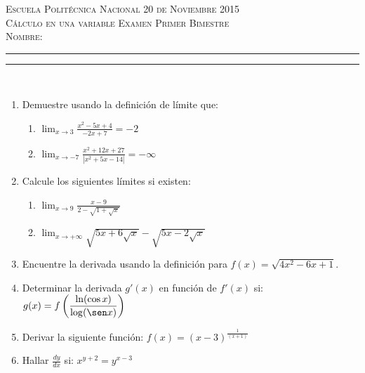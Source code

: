 \documentclass[11pt,a4paper,oneside]{article}\usepackage[]{graphicx}\usepackage[]{color}
\begin{document}
\thispagestyle{empty}
{\sf
{\Large \scshape Escuela Polit\'{e}cnica Nacional} \hfill {\scshape 20 de Noviembre 2015}\\[3mm] 
{\scshape C\'{a}lculo en una variable \hfill Examen Primer Bimestre}\\[7mm]
{\scshape Nombre:} \rule{0.6\textwidth}{0.5pt} \rule{0.1\textwidth}{0.5pt}\\
}













\begin{enumerate}
      \item Demuestre usando la definici\'{o}n de l\'{i}mite que:
      \begin{enumerate}
            \item $\displaystyle \lim_{x \to 3} \displaystyle \frac{x^2-5x+4}{-2x+7}=-2$\\[100mm]
            \item $\displaystyle \lim_{x \to -7} \displaystyle \frac{x^2+12x+27}{|x^2+5x-14|}=-\infty$\\[70mm]
      \end{enumerate}
      \newpage
      \item Calcule los siguientes l\'{i}mites si existen:
      \begin{enumerate}
            \item $\displaystyle \lim_{x \to 9} \displaystyle \frac{x-9}{2-\sqrt{1+\sqrt{x}}}$\\[100mm]
            \item $\displaystyle \lim_{x \to +\infty} \displaystyle \sqrt{5x+6\sqrt{x}}-\sqrt{5x-2\sqrt{x}}$\\[70mm]
      \end{enumerate}
      \newpage
      \item Encuentre la derivada usando la definición para $f(x)=\sqrt{4x^2-6x+1}$.\\[100mm]
      
      \item Determinar la derivada $g'(x)$ en funci\'{o}n de $f'(x)$ si: $g(x)=f\left(\displaystyle \frac{\ln(\cos x)}{\log(\sen x)}\right)$\\[70mm]
      \newpage
      \item Derivar la siguiente funci\'{o}n: $f(x)=(x-3)^{\displaystyle \frac{1}{(x+1)}}$\\[100mm]
      
      \item Hallar $\displaystyle \frac{dy}{dx}$ si: $x^{y+2}=y^{x-3}$\\[70mm]

\end{enumerate}
\end{document}
